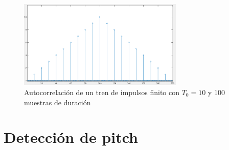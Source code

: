 \documentclass[12pt]{article}
\begin{document}
\begin{figure}[H]
	\centering
	\includegraphics[width=0.7\textwidth]{autocorr_tren_finito.png}
	\caption{Autocorrelación de un tren de impulsos finito con $T_0 = 10$ y 100 muestras de duración}
	
\end{figure}


\section{Detección de pitch}

%
\end{document}
